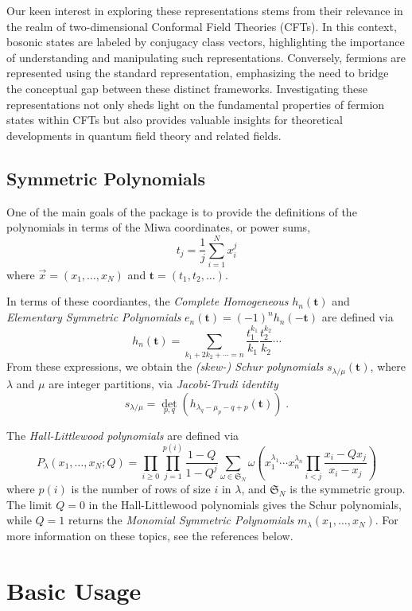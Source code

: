 \documentclass[a4paper,10pt]{amsart}
\begin{document}
Our keen interest in exploring these representations stems
from their relevance in the realm of two-dimensional Conformal Field
Theories (CFTs). In this context, bosonic states are labeled by
conjugacy class vectors, highlighting the importance of
understanding and manipulating such representations. Conversely,
fermions are represented using the standard representation,
emphasizing the need to bridge the conceptual gap between these
distinct frameworks. Investigating these representations not only
sheds light on the fundamental properties of fermion states within
CFTs but also provides valuable insights for theoretical developments
in quantum field theory and related fields.

\subsection{Symmetric Polynomials}

One of the main goals of the package is to provide the definitions of the 
polynomials in terms of the Miwa coordinates, or power sums, 
$$ t_j = \frac{1}{j} \sum_{i=1}^N x_i^j $$ where $\vec{x} = 
(x_1, \dots, x_N)$ and $\mathbf{t} = (t_1, t_2, \dots)$.

In terms of these coordiantes, the \emph{Complete Homogeneous} $h_n(\mathbf{t})$ 
and \emph{Elementary Symmetric Polynomials} $e_n(\mathbf{t}) = 
(-1)^n h_n(-\mathbf{t})$ are defined via 
$$ h_n(\mathbf{t}) = \sum_{k_1 + 2k_2+ \cdots = n} 
\frac{t_1^{k_1}}{k_1}\frac{t_2^{k_2}}{k_2} \cdots $$
From these expressions, we obtain the \emph{(skew-) Schur polynomials}
$s_{\lambda/\mu}(\mathbf{t})$, where 
$\lambda$ and $\mu$ are integer partitions, via \emph{Jacobi-Trudi identity}
$$ s_{\lambda/\mu} = \det_{p,q}(h_{\lambda_q - \mu_p - q + p}(\mathbf{t})) \; . $$

The \emph{Hall-Littlewood polynomials} are defined via
$$
P_{\lambda}(x_1, \dots, x_N; Q) = \prod_{i\geq 0} \prod_{j=1}^{p(i)}
\frac{1-Q}{1-Q^j} \sum_{\omega \in \mathfrak{S}_N} \omega\left(
x_1^{\lambda_1}\cdots x_n^{\lambda_n} \prod_{i<j} \frac{x_i - Q
  x_j}{x_i - x_j} \right)
$$
where $p(i)$ is the number of rows of size $i$ in $\lambda$, and
$\mathfrak{S}_N$ is the symmetric group. The limit $Q=0$ in the
Hall-Littlewood polynomials gives the Schur polynomials, while $Q=1$
returns the \emph{Monomial Symmetric Polynomials} $m_\lambda(x_1,
\dots, x_N)$. For more information on these topics, see the references
below.


\section{Basic Usage}
\end{document}
